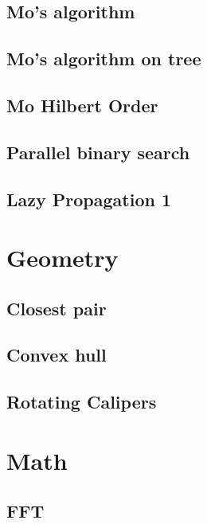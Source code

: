 \documentclass[10pt,landscape,a4paper,twocolumn]{article}
\begin{document}
\subsection{Mo's algorithm}


\subsection{Mo's algorithm on tree}


\subsection{Mo Hilbert Order}


\subsection{Parallel binary search}


\subsection{Lazy Propagation 1}


\section{Geometry}
\subsection{Closest pair}


\subsection{Convex hull}


\subsection{Rotating Calipers}


\section{Math}
\subsection{FFT}

\end{document}
